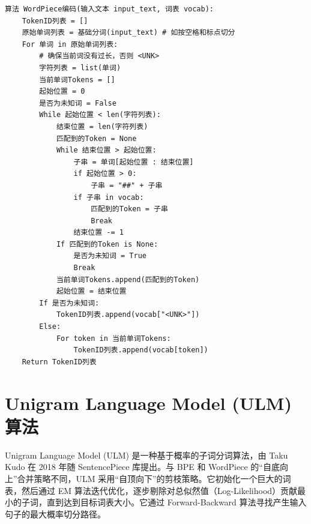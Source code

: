 \documentclass[11pt, a4paper]{article}
\begin{document}
\begin{lstlisting}[caption={WordPiece 编码}]
算法 WordPiece编码(输入文本 input_text, 词表 vocab):
    TokenID列表 = []
    原始单词列表 = 基础分词(input_text) # 如按空格和标点切分
    For 单词 in 原始单词列表:
        # 确保当前词没有过长，否则 <UNK>
        字符列表 = list(单词)
        当前单词Tokens = []
        起始位置 = 0
        是否为未知词 = False
        While 起始位置 < len(字符列表):
            结束位置 = len(字符列表)
            匹配到的Token = None
            While 结束位置 > 起始位置:
                子串 = 单词[起始位置 : 结束位置]
                if 起始位置 > 0:
                    子串 = "##" + 子串
                if 子串 in vocab:
                    匹配到的Token = 子串
                    Break
                结束位置 -= 1
            If 匹配到的Token is None:
                是否为未知词 = True
                Break
            当前单词Tokens.append(匹配到的Token)
            起始位置 = 结束位置
        If 是否为未知词:
            TokenID列表.append(vocab["<UNK>"])
        Else:
            For token in 当前单词Tokens:
                TokenID列表.append(vocab[token])
    Return TokenID列表
\end{lstlisting}

\section{Unigram Language Model (ULM) 算法}

Unigram Language Model (ULM) 是一种基于概率的子词分词算法，由 Taku Kudo 在 2018 年随 SentencePiece 库提出。与 BPE 和 WordPiece 的“自底向上”合并策略不同，ULM 采用“自顶向下”的剪枝策略。它初始化一个巨大的词表，然后通过 EM 算法迭代优化，逐步剔除对总似然值（Log-Likelihood）贡献最小的子词，直到达到目标词表大小。它通过 Forward-Backward 算法寻找产生输入句子的最大概率切分路径。
\end{document}
